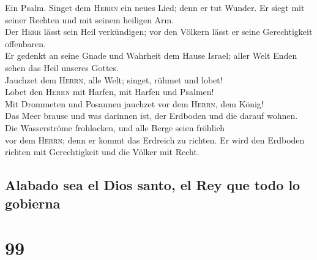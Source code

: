  Ein Psalm. Singet dem \textsc{Herrn} ein neues Lied; denn
er tut Wunder. Er siegt mit seiner Rechten und mit seinem heiligen
Arm.\\
 Der \textsc{Herr} lässt sein Heil verkündigen; vor den
Völkern lässt er seine Gerechtigkeit offenbaren.\\
 Er gedenkt an seine Gnade und Wahrheit dem Hause Israel;
aller Welt Enden sehen das Heil unseres Gottes.\\
 Jauchzet dem \textsc{Herrn}, alle Welt; singet, rühmet
und lobet!\\
 Lobet den \textsc{Herrn} mit Harfen, mit Harfen und
Psalmen!\\
 Mit Drommeten und Posaunen jauchzet vor dem
\textsc{Herrn}, dem König!\\
 Das Meer brause und was darinnen ist, der Erdboden und
die darauf wohnen.\\
 Die Wasserströme frohlocken, und alle Berge seien
fröhlich\\
 vor dem \textsc{Herrn}; denn er kommt das Erdreich zu
richten. Er wird den Erdboden richten mit Gerechtigkeit und die Völker
mit Recht.

\hypertarget{alabado-sea-el-dios-santo-el-rey-que-todo-lo-gobierna}{%
\subsection{Alabado sea el Dios santo, el Rey que todo lo
gobierna}\label{alabado-sea-el-dios-santo-el-rey-que-todo-lo-gobierna}}

\hypertarget{section-98}{%
\section{99}\label{section-98}}

